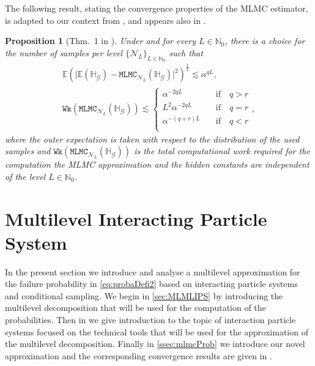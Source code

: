 \documentclass{article}
\newtheorem{proposition}[theorem]{Proposition}
\newcommand{\cG}{\mathcal{G}}
\newcommand{\cN}{\mathcal{N}}
\newcommand{\IE}{\mathbb{E}}
\newcommand{\IH}{\mathbb{H}}
\newcommand{\IN}{\mathbb{N}}
\newcommand{\mlmc}[2]{\mathtt{MLMC}_{#1}{\left(#2\right)}}
\newcommand{\work}[1]{\mathtt{Wk}\!\left(#1\right)}
\theoremstyle{definition}
\begin{document}
The following result, stating the convergence properties of the MLMC estimator, is adapted to our
context from \cite{cliffeMultilevelMonteCarlo2011}, and appears also in
\cite{barthMultilevelMonteCarlo2011,elfversonMultilevelMonteCarlo2016}.

\begin{proposition}[Thm.~1 in \cite{cliffeMultilevelMonteCarlo2011}]
  \label{prop:MLMCRate}
  Under  and for every $L\in\IN_0$, there is a choice for the number of samples per
  level $\{\cN_L\}_{L\in\IN_0}$ such that
  \begin{gather*}
    \IE\left(\vert{\IE(\IH_{\cG})-\mlmc{\cN_L}{\IH_{\cG}}\vert^{2}}\right)^{\frac{1}{2}}\lesssim\alpha^{qL},\\
    \work{\mlmc{\cN_L}{\IH_\cG}}\lesssim\begin{cases}
      \alpha^{-2qL}\quad &\text{if}\quad q>r\\
      L^2\alpha^{-2qL}\quad &\text{if}\quad q=r\\
      \alpha^{-(q+r)L}\quad &\text{if}\quad q<r\\
    \end{cases},
  \end{gather*}
  where the outer expectation is taken with respect to the distribution of the used samples
  and $\work{\mlmc{\cN_L}{\IH_\cG}}$ is the total computational work required for the computation the MLMC approximation and the hidden constants are independent of the level $L\in\IN_0$.
\end{proposition}

\section{Multilevel Interacting Particle System}
\label{sec:mlips}
In the present section we introduce and analyse a multilevel approximation for the failure probability
in \cref{eq:probaDefi2} based on interacting particle systems and conditional sampling. We begin in \cref{sec:MLMLIPS} by introducing the multilevel decomposition that will be used for the computation of the probabilities. Then in  we give introduction to the topic of interaction particle systems focused on the technical tools that will be used for the approximation of the multilevel decomposition.  Finally in \cref{ssec:mlmcProb} we introduce our novel approximation and the corresponding convergence results are given in .
\end{document}
